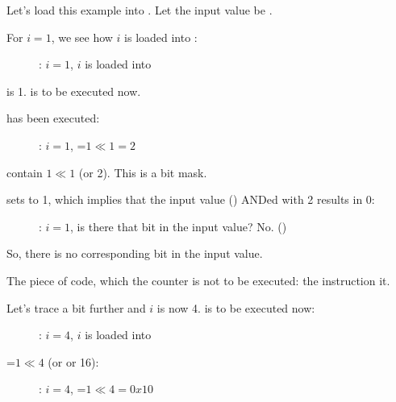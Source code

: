 ﻿\clearpage
\mysubparagraph{\olly}
\myindex{\olly}

Let's load this example into \olly. 
Let the input value be .

For $i=1$, we see how $i$ is loaded into \ECX: 

\begin{figure}[H]
\centering
{}
\caption{\olly: $i=1$, $i$ is loaded into \ECX}
\label{fig:shifts_olly1_1}
\end{figure}

\EDX is 1. \SHL is to be executed now.

\clearpage
\SHL has been executed:

\begin{figure}[H]
\centering
{}
\caption{\olly: $i=1$, \EDX=$1 \ll 1=2$}
\label{fig:shifts_olly1_2}
\end{figure}

\EDX contain $1 \ll 1$ (or 2). This is a bit mask.

\clearpage
\AND sets \ZF to 1, which implies that the input value ()  ANDed with 2 results in 0:

\begin{figure}[H]
\centering
{}
\caption{\olly: $i=1$, 
is there that bit in the input value? No. ()}
\label{fig:shifts_olly1_3}
\end{figure}

So, there is no corresponding bit in the input value.

The piece of code, which  the counter is not to be executed: 
the \JZ instruction  it.

\clearpage
Let's trace a bit further and $i$ is now 4.
\SHL is to be executed now:

\begin{figure}[H]
\centering
{}
\caption{\olly: $i=4$, $i$ is loaded into \ECX}
\label{fig:shifts_olly4_1}
\end{figure}

\clearpage
\EDX=$1 \ll 4$ (or  or 16): 

\begin{figure}[H]
\centering
{}
\caption{\olly: $i=4$, \EDX=$1 \ll 4=0x10$}
\label{fig:shifts_olly4_2}
\end{figure}

